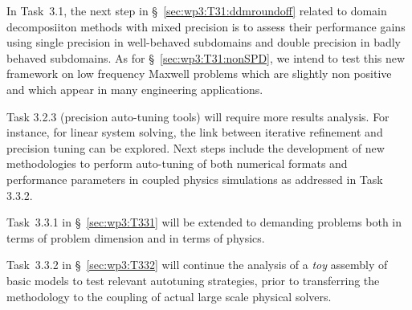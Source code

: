 
In Task~3.1, the next step in \S~\ref{sec:wp3:T31:ddmroundoff} related to domain decomposiiton methods with mixed precision is to assess their performance gains using single precision in well-behaved subdomains and double precision in badly behaved subdomains. As for \S~\ref{sec:wp3:T31:nonSPD}, we intend to test this new framework on low frequency Maxwell problems which are slightly non positive and which appear in many engineering applications. 


Task 3.2.3 (precision auto-tuning tools) will require 
more results analysis. For instance, for linear system solving, the link between iterative refinement and precision tuning can be explored.
Next steps include the development of new methodologies to perform auto-tuning of both numerical formats and performance parameters in coupled physics simulations as addressed in Task 3.3.2.

Task~3.3.1 in \S~\ref{sec:wp3:T331} will be extended to demanding problems both in terms of problem dimension and in terms of physics. 

Task~3.3.2 in \S~\ref{sec:wp3:T332} will continue the analysis of a \textit{toy} assembly of basic models to test relevant autotuning strategies, prior to transferring the methodology to the coupling of actual large scale physical solvers.


